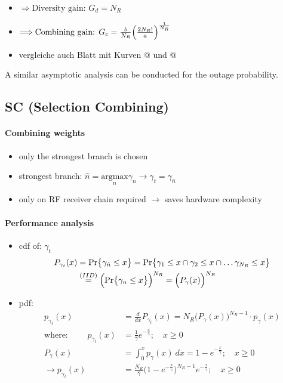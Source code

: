 \documentclass[a4paper, 10pt]{article}
\makeatletter
\newcommand{\Rmnum}[1]{\expandafter\@slowromancap\romannumeral #1@}
\makeatother
\begin{document}
\begin{itemize}
\begin{itemize}
		\item[] $\Longrightarrow \text{Diversity gain: } G_d = N_R$
		\item[] $\Longrightarrow \text{Combining gain: } G_c = \frac{b}{N_R}\Bigl( \frac{2N_R!}{a}\Bigr)^{\frac{1}{N_R}}$
		\item[] vergleiche auch Blatt mit Kurven \Rmnum{3} und \Rmnum{4}
	\end{itemize}
\end{itemize}
A similar asymptotic analysis can be conducted for the outage probability.
\subsection{SC (Selection Combining)}
\paragraph*{Combining weights}
	\begin{itemize}
		\item only the strongest branch is chosen
		\item strongest branch: $\hat{n} = \underset{n}{\text{argmax}} \gamma _n \longrightarrow \gamma _t = \gamma _{\hat{n}}$
		\item only on RF receiver chain required $\rightarrow$\; saves hardware complexity 
	\end{itemize}
\paragraph*{Performance analysis}
	\begin{itemize}
		\item cdf of: $\gamma _t$
			\begin{align*}
				P_{\gamma _t}(x) &= \text{Pr}\bigl\{\gamma _{\hat{n}} \leq x\bigr\} = \text{Pr}\bigl\{\gamma _1 \leq x \cap \gamma _2 \leq x \cap \dots \gamma _{N_R} \leq x\bigr\}\\
				&\overset{(IID)}{=} \Bigl(\text{Pr}\bigl\{\gamma _n \leq x\bigr\}\Bigr)^{N_R} = \Bigl( P_{\gamma}(x)\Bigr)^{N_R}
			\end{align*}
		\item pdf:
			\begin{align*}
				p_{\gamma _t}(x) &= \frac{d}{dx}P_{\gamma _t}(x) = N_R\bigl(P_{\gamma}(x)\bigr)^{N_R-1}\cdot p_{\gamma}(x)\\
				\text{where: }\qquad p_{\gamma _t}(x) &= \frac{1}{\bar{\gamma}}e^{-\frac{x}{\bar{\gamma}}};\quad x\geq 0\\
				P_{\gamma}(x) &= \int_{0}^{x}p_{\gamma}(x)~dx = 1 - e^{-\frac{x}{\bar{\gamma}}};\quad x\geq 0\\
				\rightarrow p_{\gamma _t}(x) &= \frac{N_R}{\bar{\gamma}}\bigl( 1 - e^{-\frac{x}{\bar{\gamma}}}\bigr)^{N_R-1}e^{-\frac{x}{\bar{\gamma}}};\quad x\geq 0
			\end{align*}
	\end{itemize}
\end{document}
